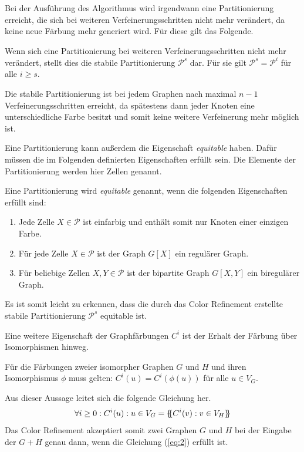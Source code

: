 Bei der Ausführung des Algorithmus wird irgendwann eine Partitionierung erreicht, die sich bei weiteren Verfeinerungsschritten nicht mehr verändert, da keine neue Färbung mehr generiert wird. Für diese gilt das Folgende.
\begin{Definition}
	Wenn sich eine Partitionierung bei weiteren Verfeinerungsschritten nicht mehr verändert, stellt dies die stabile Partitionierung $\mathcal{P}^s$ dar. Für sie gilt $\mathcal{P}^s=\mathcal{P}^i$ für alle $i\geq s$.
\end{Definition}
Die stabile Partitionierung ist bei jedem Graphen nach maximal $n-1$ Verfeinerungsschritten erreicht, da spätestens dann jeder Knoten eine unterschiedliche Farbe besitzt und somit keine weitere Verfeinerung mehr möglich ist.

Eine Partitionierung kann außerdem die Eigenschaft \emph{equitable} haben. Dafür müssen die im Folgenden definierten Eigenschaften erfüllt sein. Die Elemente der Partitionierung werden hier Zellen genannt.
\begin{Definition}
	Eine Partitionierung wird \emph{equitable} genannt, wenn die folgenden Eigenschaften erfüllt sind:
	\begin{enumerate}
		\item Jede Zelle $X\in \mathcal{P}$ ist einfarbig und enthält somit nur Knoten einer einzigen Farbe.
		\item Für jede Zelle $X\in \mathcal{P}$ ist der Graph $G[X]$ ein regulärer Graph.
		\item Für beliebige Zellen $X,Y\in \mathcal{P}$ ist der bipartite Graph $G[X,Y]$ ein biregulärer Graph.
	\end{enumerate}
\end{Definition}
Es ist somit leicht zu erkennen, dass die durch das Color Refinement erstellte stabile Partitionierung $\mathcal{P}^s$ equitable ist.

Eine weitere Eigenschaft der Graphfärbungen $C^i$ ist der Erhalt der Färbung über Isomorphismen hinweg.
\begin{Lemma}
	Für die Färbungen zweier isomorpher Graphen $G$ und $H$ und ihren Isomorphismus $\phi$ muss gelten: $C^i(u)=C^i(\phi (u))$ für alle $u\in V_G$.
\end{Lemma}
Aus dieser Aussage leitet sich die folgende Gleichung her.
\begin{equation}
\forall i\geq 0:{{C^i(u):u\in V_G}}=\{\mskip-5mu\{ C^i(v):v\in V_H\}\mskip-5mu\} 
\label{eq:2}
\end{equation}
Das Color Refinement akzeptiert somit zwei Graphen $G$ und $H$ bei der Eingabe der  $G+H$ genau dann, wenn die Gleichung (\ref{eq:2}) erfüllt ist.

